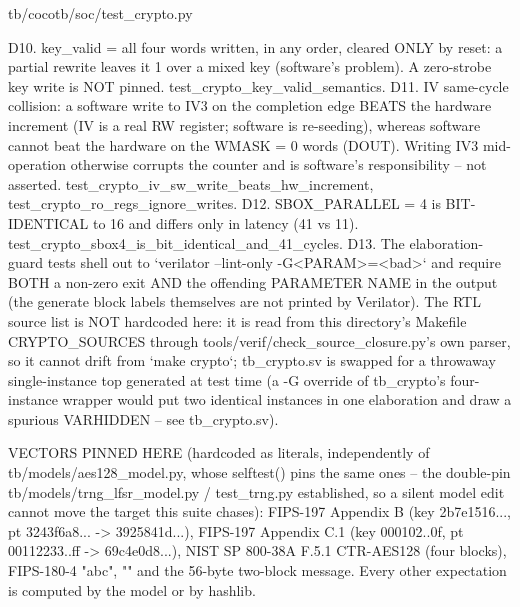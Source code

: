 \begin{relocated}{tb/cocotb/soc/test_crypto.py}
\begin{textblock}
D10. key_valid = all four words written, in any order, cleared ONLY by reset: a partial rewrite
leaves it 1 over a mixed key (software's problem).  A zero-strobe key write is NOT pinned.
test_crypto_key_valid_semantics.
D11. IV same-cycle collision: a software write to IV3 on the completion edge BEATS the hardware
increment (IV is a real RW register; software is re-seeding), whereas software cannot beat
the hardware on the WMASK = 0 words (DOUT).  Writing IV3 mid-operation otherwise corrupts
the counter and is software's responsibility -- not asserted.
test_crypto_iv_sw_write_beats_hw_increment, test_crypto_ro_regs_ignore_writes.
D12. SBOX_PARALLEL = 4 is BIT-IDENTICAL to 16 and differs only in latency (41 vs 11).
test_crypto_sbox4_is_bit_identical_and_41_cycles.
D13. The elaboration-guard tests shell out to `verilator --lint-only -G<PARAM>=<bad>` and
require BOTH a non-zero exit AND the offending PARAMETER NAME in the output (the generate
block labels themselves are not printed by Verilator).  The RTL source list is NOT
hardcoded here: it is read from this directory's Makefile CRYPTO_SOURCES through
tools/verif/check_source_closure.py's own parser, so it cannot drift from `make crypto`;
tb_crypto.sv is swapped for a throwaway single-instance top generated at test time (a -G
override of tb_crypto's four-instance wrapper would put two identical instances in one
elaboration and draw a spurious VARHIDDEN -- see tb_crypto.sv).

VECTORS PINNED HERE (hardcoded as literals, independently of tb/models/aes128_model.py, whose
selftest() pins the same ones -- the double-pin tb/models/trng_lfsr_model.py / test_trng.py
established, so a silent model edit cannot move the target this suite chases):
FIPS-197 Appendix B (key 2b7e1516..., pt 3243f6a8... -> 3925841d...), FIPS-197 Appendix C.1
(key 000102..0f, pt 00112233..ff -> 69c4e0d8...), NIST SP 800-38A F.5.1 CTR-AES128 (four
blocks), FIPS-180-4 "abc", "" and the 56-byte two-block message.  Every other expectation is
computed by the model or by hashlib.


\end{textblock}
\end{relocated}
